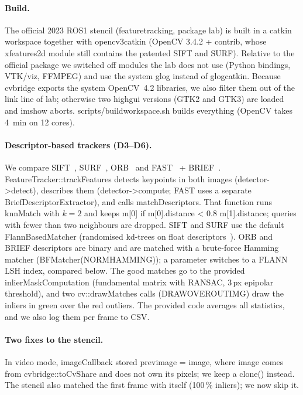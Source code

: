 \documentclass[11pt,a4paper]{article}
\DeclareRobustCommand{\code}[1]{\begingroup\ttfamily\codebreaks#1\endgroup}
\newcommand{\codebreaks}{\renewcommand{\_}{\textunderscore\allowbreak}}
\begin{document}
\paragraph{Build.} The official 2023 ROS1 stencil (\code{feature\_tracking}, package
\code{lab\_5}) is built in a catkin workspace together with \code{opencv3\_catkin}
(OpenCV 3.4.2 + contrib, whose \code{xfeatures2d} module still contains the patented
SIFT and SURF). Relative to the official package we switched off modules the lab does
not use (Python bindings, VTK/viz, FFMPEG) and use the system glog instead of
\code{glog\_catkin}. Because \code{cv\_bridge} exports the system OpenCV~4.2 libraries,
we also filter them out of the link line of \code{lab\_5}; otherwise two
\code{highgui} versions (GTK2 and GTK3) are loaded and \code{imshow} aborts.
\code{scripts/build\_workspace.sh} builds everything (OpenCV takes 4~min on 12 cores).

\paragraph{Descriptor-based trackers (D3--D6).} We compare SIFT~\cite{lowe2004sift},
SURF~\cite{bay2006surf}, ORB~\cite{rublee2011orb} and FAST~\cite{rosten2006fast} +
BRIEF~\cite{calonder2010brief}.
\code{FeatureTracker::trackFeatures} detects keypoints in both images
(\code{detector->detect}), describes them (\code{detector->compute}; FAST uses a
separate \code{BriefDescriptorExtractor}), and calls \code{matchDescriptors}. That
function runs \code{knnMatch} with $k=2$ and keeps \code{m[0]} if
\code{m[0].distance < 0.8 m[1].distance}; queries with fewer than two neighbours are
dropped. SIFT and SURF use the default \code{FlannBasedMatcher} (randomised kd-trees on
float descriptors~\cite{muja2009flann}). ORB and BRIEF descriptors are binary and are
matched with a brute-force Hamming matcher (\code{BFMatcher(NORM\_HAMMING)}); a
parameter switches to a FLANN LSH index, compared below.
The good matches go to the provided \code{inlierMaskComputation} (fundamental matrix
with RANSAC, 3\,px epipolar threshold), and two \code{cv::drawMatches} calls
(\code{DRAW\_OVER\_OUTIMG}) draw the inliers in green over the red outliers. The
provided code averages all statistics, and we also log them per frame to CSV.

\paragraph{Two fixes to the stencil.} In video mode, \code{imageCallback} stored
\code{prev\_image = image}, where \code{image} comes from \code{cv\_bridge::toCvShare} and
does not own its pixels; we keep a \code{clone()} instead. The stencil also matched the
first frame with itself (100\,\% inliers); we now skip it.
\end{document}
